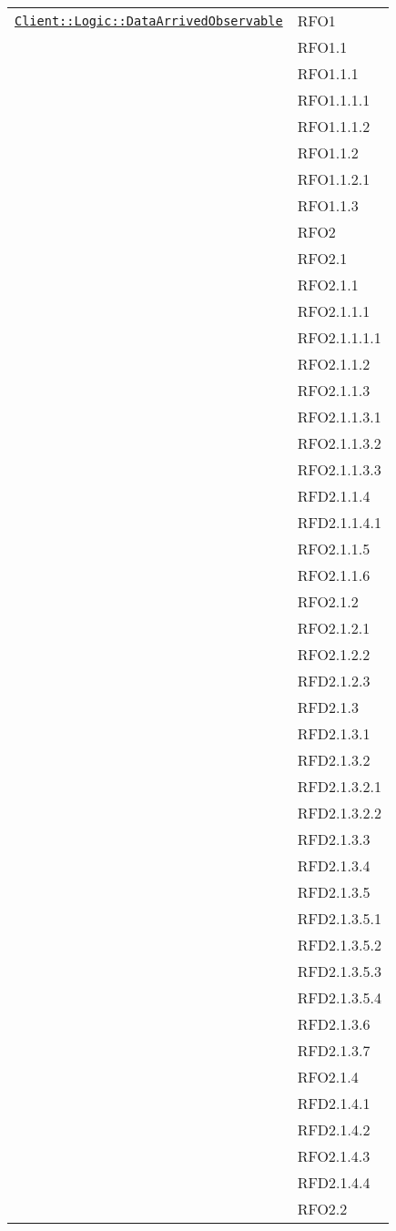 \begin{longtable}{|>{\centering}m{10cm}|m{3cm}<{\centering}|}
\hyperref[Client::Logic::DataArrivedObservable]{\texttt{Client::Logic::DataArrivedObservable}} & RFO1\\
& RFO1.1\\
& RFO1.1.1\\
& RFO1.1.1.1\\
& RFO1.1.1.2\\
& RFO1.1.2\\
& RFO1.1.2.1\\
& RFO1.1.3\\
& RFO2\\
& RFO2.1\\
& RFO2.1.1\\
& RFO2.1.1.1\\
& RFO2.1.1.1.1\\
& RFO2.1.1.2\\
& RFO2.1.1.3\\
& RFO2.1.1.3.1\\
& RFO2.1.1.3.2\\
& RFO2.1.1.3.3\\
& RFD2.1.1.4\\
& RFD2.1.1.4.1\\
& RFO2.1.1.5\\
& RFO2.1.1.6\\
& RFO2.1.2\\
& RFO2.1.2.1\\
& RFO2.1.2.2\\
& RFD2.1.2.3\\
& RFD2.1.3\\
& RFD2.1.3.1\\
& RFD2.1.3.2\\
& RFD2.1.3.2.1\\
& RFD2.1.3.2.2\\
& RFD2.1.3.3\\
& RFD2.1.3.4\\
& RFD2.1.3.5\\
& RFD2.1.3.5.1\\
& RFD2.1.3.5.2\\
& RFD2.1.3.5.3\\
& RFD2.1.3.5.4\\
& RFD2.1.3.6\\
& RFD2.1.3.7\\
& RFO2.1.4\\
& RFD2.1.4.1\\
& RFD2.1.4.2\\
& RFO2.1.4.3\\
& RFD2.1.4.4\\
& RFO2.2\\

\end{longtable}
